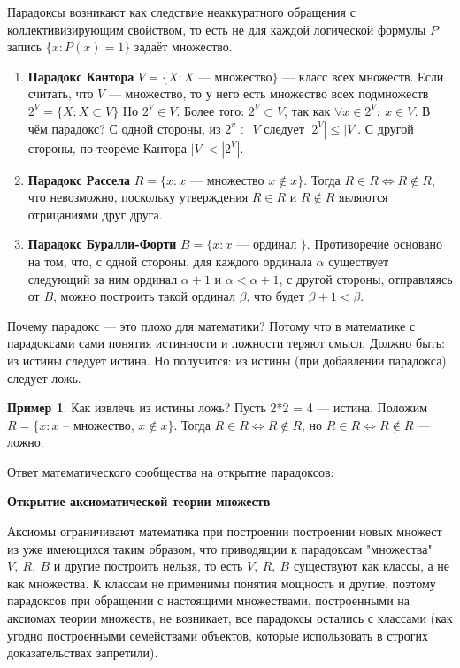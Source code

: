 \documentclass[12pt,oneside]{article}
\theoremstyle{definition}
\newtheorem{exmp}{Пример}[section]
\begin{document}
Парадоксы возникают как следствие неаккуратного обращения с коллективизирующим свойством, то есть не для каждой логической формулы $P$ запись $\{x: P(x)=1\}$ задаёт множество.
\begin{enumerate}
    \item \textbf{Парадокс Кантора}
    $V = \{X: X $ --- множество$\}$ --- класс всех множеств.
    Если считать, что $V$ --- множество, то у него есть множество всех подмножеств $2^V = \{X: X\subset V\}$ Но $2^V \in V$. Более того: $2^V \subset V$, так как $\forall x\in 2^V :\ x\in V$.
    В чём парадокс? С одной стороны, из $2^v \subset V$ следует $|2^V| \leqslant |V|$. С другой стороны, по теореме Кантора $|V| < |2^V|$.
    \item \textbf{Парадокс Рассела}
    $R = \{x: x$ --- множество $ x\notin x\}$. Тогда $R\in R \Longleftrightarrow R\notin R$, что невозможно, поскольку утверждения $R\in R$ и $R\notin R$ являются отрицаниями друг друга.
    \item \textbf{\href{https://en.wikipedia.org/wiki/Burali-Forti_paradox}{Парадокс Буралли-Форти}} $B = \{x: x$ --- ординал $\}$. Противоречие основано на том, что, с одной стороны, для каждого ординала $\alpha$ существует следующий за ним ординал $\alpha+1$ и $\alpha < \alpha+1$, с другой стороны, отправляясь от $B$, можно построить такой ординал $\beta$, что будет $\beta+1<\beta$.
    
\end{enumerate}

Почему парадокс --- это плохо для математики? Потому что в математике с парадоксами сами понятия истинности и ложности теряют смысл. Должно быть: из истины следует истина. Но получится: из истины (при добавлении парадокса) следует ложь. 
\begin{exmp}
Как извлечь из истины ложь? Пусть 2*2 = 4 --- истина. Положим $R = \{x: x$ -- множество, $x\notin x\}$. Тогда $R\in R \Longleftrightarrow R\notin R$, но $R\in R \Longleftrightarrow R\notin R$ --- ложно.
\end{exmp}

Ответ математического сообщества на открытие парадоксов:

\textbf{Открытие аксиоматической теории множеств}
    
    Аксиомы ограничивают математика при построении построении новых множест из уже имеющихся таким образом, что приводящии к парадоксам "множества"\ $V,\ R,\ B$ и другие построить нельзя, то есть $V,\ R,\ B$ существуют как классы, а не как множества. К классам не применимы понятия мощность и другие, поэтому парадоксов при обращении с настоящими множествами, построенными на аксиомах теории множеств, не возникает, все парадоксы остались с классами (как угодно построенными семействами объектов, которые использовать в строгих доказательствах запретили).
\end{document}
